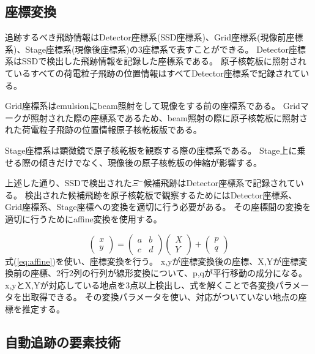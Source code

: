 \documentclass[12pt,a4paper]{jarticle}
\begin{document}
\subsection{座標変換}
追跡するべき飛跡情報はDetector座標系(SSD座標系)、Grid座標系(現像前座標系)、Stage座標系(現像後座標系)の3座標系で表すことができる。
Detector座標系はSSDで検出した飛跡情報を記録した座標系である。
原子核乾板に照射されているすべての荷電粒子飛跡の位置情報はすべてDetector座標系で記録されている。
\par
Grid座標系はemulsionにbeam照射をして現像をする前の座標系である。
Gridマークが照射された際の座標系であるため、beam照射の際に原子核乾板に照射された荷電粒子飛跡の位置情報原子核乾板版である。
\par
Stage座標系は顕微鏡で原子核乾板を観察する際の座標系である。
Stage上に乗せる際の傾きだけでなく、現像後の原子核乾板の伸縮が影響する。
\par
上述した通り、SSDで検出された$\Xi$$^-$候補飛跡はDetector座標系で記録されている。
検出された候補飛跡を原子核乾板で観察するためにはDetector座標系、Grid座標系、Stage座標への変換を適切に行う必要がある。
その座標間の変換を適切に行うためにaffine変換を使用する。
\par
\begin{equation}
  \left(
    \begin{array}{c}
    x \\
    y
    \end{array}
  \right)
  =
  \left(
    \begin{array}{cc}
      a & b \\
      c & d
    \end{array}
  \right)
  \left(
    \begin{array}{c}
      X \\
      Y
    \end{array}
  \right)
  +
  \left(
    \begin{array}{c}
      p \\
      q
    \end{array}
  \right)
\label{eq:affine}
\end{equation}
式(\ref{eq:affine})を使い、座標変換を行う。
x,yが座標変換後の座標、X,Yが座標変換前の座標、2行2列の行列が線形変換について、p,qが平行移動の成分になる。
x,yとX,Yが対応している地点を3点以上検出し、式を解くことで各変換パラメータを出取得できる。
その変換パラメータを使い、対応がついていない地点の座標を推定する。
\subsection{自動追跡の要素技術}
\end{document}

